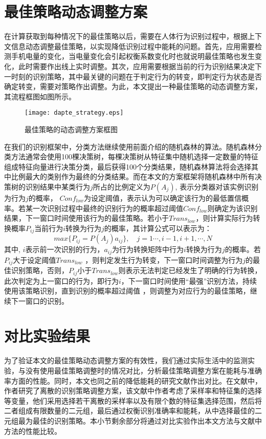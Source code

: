 \section{最佳策略动态调整方案}
\par 在计算获取到每种情况下的最佳策略以后，需要在人体行为识别过程中，根据上下文信息动态调整最佳策略，以实现降低识别过程中能耗的问题。首先，应用需要检测手机电量的变化，当电量变化会引起权衡系数变化时也就说明最佳策略也发生变化，此时需要作出线上实时调整。其次，应用需要根据当前的行为识别结果决定下一时刻的识别策略，其中最关键的问题在于判定行为的转变，即判定行为状态是否确定转变，需要对策略作出调整。为此，本文提出一种最佳策略的动态调整方案，其流程框图如图所示。
\begin{figure}[ht]
\centering
\texttt{[image: dapte\_strategy.eps]}
\caption{最佳策略的动态调整方案框图}
\end{figure}

\par 在我们的识别框架中，分类方法继续使用前面介绍的随机森林的算法。随机森林分类方法通常会使用100棵决策树，每棵决策树从特征集中随机选择一定数量的特征组成特征向量进行决策分类，最后获得100个分类结果，随机森林算法将会选择其中比例最大的类别作为最终的分类结果。而在本文的方案框架将随机森林中所有决策树的识别结果中某类行为$j$所占的比例定义为$P(A_j)$, 表示分类器对该实例识别为行为$j$的概率， $Conf_{low}$为设定阈值，表示认为可以确定该行为的最低置信概率。若某一次识别过程中最终的识别行为的概率超过阈值$Conf_{low}$则确定为该识别结果，下一窗口时间使用该行为的最佳策略。若小于$Trans_{low}$，则计算实际行为转换概率$P_{ij}$当前行为$i$转换为行为$j$的概率，其计算公式可以表示为：
\begin{equation}
	max \{P_{ij} = P(A_j)a_{ij}\}, \quad j = 1 \cdots, i-1, i+1, \cdots, N
\end{equation}
其中, $i$表示前一次识别的行为，$a_{ij}$为行为转换矩阵中行为$i$转换为行为$j$的概率。若$P_{ij}$大于设定阈值$Trans_{low}$ ，则判定发生行为转变，下一窗口时间调整为行为$j$的最佳识别策略，否则，$P_{ij}$小于$Trans_{low}$则表示无法判定已经发生了明确的行为转换，此次判定为上一窗口的行为，即行为$i$，下一窗口时间使用“最强”识别方法，持续使用该策略识别，直到识别的概率超过阈值 ，则调整为对应行为的最佳策略，继续下一窗口的识别。

\section{对比实验结果}
\par 为了验证本文的最佳策略动态调整方案的有效性，我们通过实际生活中的监测实验，与没有使用最佳策略调整时的情况对比，分析最佳策略调整方案在能耗与准确率方面的性能。同时，本文也同之前的降低能耗的研究文献作出对比。在文献\cite{modelVarialb}中，作者研究了离散的识别策略调整方案，该文献中作者考虑了采样率和特征集的选择等变量，他们采用选择若干离散的采样率以及有限个数的特征集选择范围，然后将二者组成有限数量的二元组，最后通过权衡识别准确率和能耗，从中选择最佳的二元组最为最佳的识别策略。本小节剩余部分将通过对比实验作出本文方法与文献中方法的性能比较。

